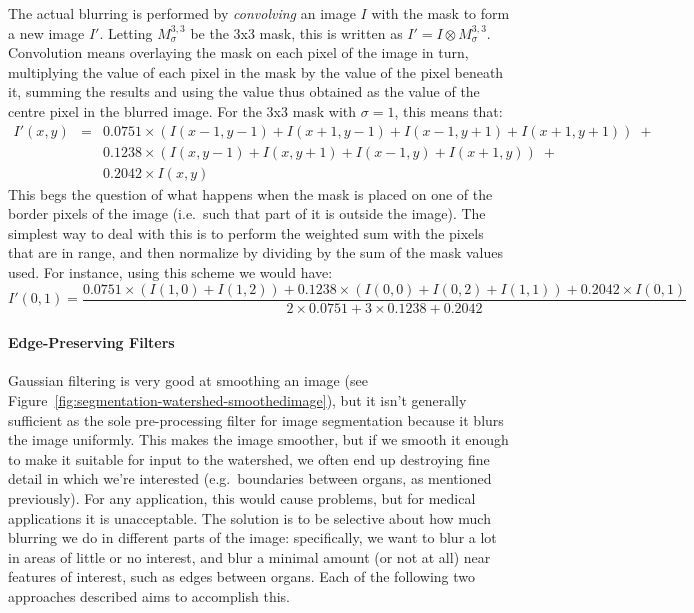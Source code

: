 The actual blurring is performed by \emph{convolving} an image $I$ with the mask to form a new image $I'$. Letting $M_\sigma^{3,3}$ be the 3x3 mask, this is written as $I' = I \otimes M_\sigma^{3,3}$. Convolution means overlaying the mask on each pixel of the image in turn, multiplying the value of each pixel in the mask by the value of the pixel beneath it, summing the results and using the value thus obtained as the value of the centre pixel in the blurred image. For the 3x3 mask with $\sigma = 1$, this means that:
%
\begin{eqnarray*}
I'(x,y)
& = & 0.0751 \times (I(x-1,y-1) + I(x+1,y-1) + I(x-1,y+1) + I(x+1,y+1)) \; + \\
&   & 0.1238 \times (I(x,y-1) + I(x,y+1) + I(x-1,y) + I(x+1,y)) \; + \\
&   & 0.2042 \times I(x,y)
\end{eqnarray*}
%
This begs the question of what happens when the mask is placed on one of the border pixels of the image (i.e.~such that part of it is outside the image). The simplest way to deal with this is to perform the weighted sum with the pixels that are in range, and then normalize by dividing by the sum of the mask values used. For instance, using this scheme we would have:
%
\[
I'(0,1) = \frac{0.0751 \times (I(1,0) + I(1,2)) + 0.1238 \times (I(0,0) + I(0,2) + I(1,1)) + 0.2042 \times I(0,1)}{2 \times 0.0751 + 3 \times 0.1238 + 0.2042}
\]

\paragraph{Edge-Preserving Filters}

Gaussian filtering is very good at smoothing an image (see Figure~\ref{fig:segmentation-watershed-smoothedimage}), but it isn't generally sufficient as the sole pre-processing filter for image segmentation because it blurs the image uniformly. This makes the image smoother, but if we smooth it enough to make it suitable for input to the watershed, we often end up destroying fine detail in which we're interested (e.g.~boundaries between organs, as mentioned previously). For any application, this would cause problems, but for medical applications it is unacceptable. The solution is to be selective about how much blurring we do in different parts of the image: specifically, we want to blur a lot in areas of little or no interest, and blur a minimal amount (or not at all) near features of interest, such as edges between organs. Each of the following two approaches described aims to accomplish this.

